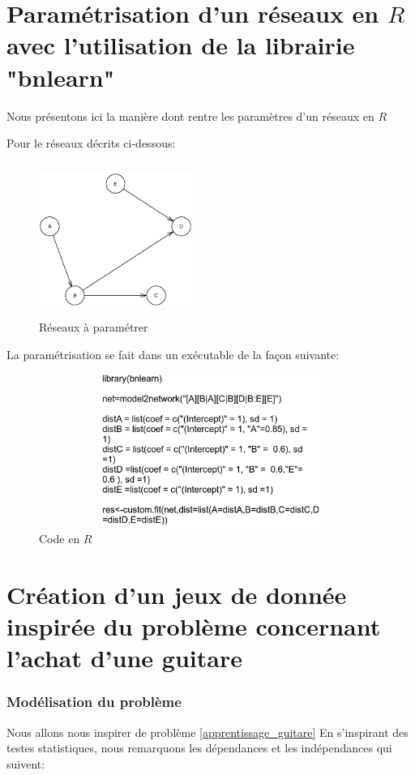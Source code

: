 \documentclass[a4paper]{article}
\begin{document}
\begin{appendices}
\newpage
\section{Paramétrisation d'un réseaux  en $R$ avec l'utilisation de la librairie "bnlearn"}
\label{parametrisation}
Nous présentons ici la manière dont rentre les paramètres d'un réseaux en  $R$

Pour le réseaux décrits ci-dessous:

\begin{figure}[H] 
    \center 
    \includegraphics[width=5cm,height=5cm]{expara.eps} 
    \caption{Réseaux à paramétrer} 
\end{figure} 

La paramétrisation se fait dans un exécutable de la façon suivante: 


\begin{figure}[H] 
    \center 
    \includegraphics[width=12cm,height=5cm]{expara1.eps} 
    \caption{Code en $R$} 
\end{figure} 


\newpage
\section{Création d'un jeux de donnée inspirée du problème concernant l'achat d'une guitare}
\label{creat_guitare}
\subsubsection{Modélisation du problème}
Nous allons nous inspirer de problème \ref{apprentissage_guitare}
En s'inspirant des testes statistiques, nous remarquons les dépendances et les indépendances qui suivent:


\end{appendices}
\end{document}
